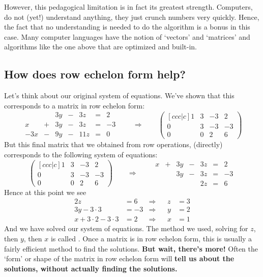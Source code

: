 \documentclass{ximera}
\begin{document}
However, this pedagogical limitation is in fact its greatest
strength. Computers, do not (yet!) understand anything, they just
crunch numbers very quickly. Hence, the fact that no understanding is
needed to do the algorithm is a bonus in this case. Many computer
languages have the notion of `vectors' and `matrices' and algorithms
like the one above that are optimized and built-in.




\subsection{How does row echelon form help?}

Let's think about our original system of equations. We've shown that
this corresponds to a matrix in row echelon form:
\[
\begin{array}{ccccccc}
       & & 3y &-& 3z &=& 2 \\
     x& +&3y&-&3z&=&-3\\
     -3x& -&9y&-&11z&=&0
\end{array}
\qquad\Longrightarrow\qquad
\begin{pmatrix}[ccc|c]
  1 &   3 & -3 & 2  \\
  0 &   3 & -3 & -3 \\
  0& 0  & 2 & 6
\end{pmatrix}
\]
But this final matrix that we obtained from row operations, (directly)
corresponds to the following system of equations:
\[
  \begin{pmatrix}[ccc|c]
    1 &   3 & -3 & 2  \\
    0 &   3 & -3 & -3 \\
    0& 0  & 2 & 6
  \end{pmatrix}
\qquad\Longrightarrow\qquad
\begin{array}{ccccccc}
     x  &+ & 3y &-& 3z &=& 2 \\
     &  &3y&-&3z&=&-3\\
     & & & &2z&=&6
\end{array}
\]
Hence at this point we see
\begin{align*}
  2z &= 6 &\Rightarrow  & & z &= 3\\
  3y-3\cdot 3 &= -3 &\Rightarrow  & & y &= 2\\
  x + 3\cdot 2 - 3\cdot 3 &= 2  &\Rightarrow & & x &= 1
\end{align*}
And we have solved our system of equations. The method we used,
solving for $z$, then $y$, then $x$ is called . Once a matrix is in row echelon form, this is usually
a fairly efficient method to find the solutions.  \textbf{But wait,
  there's more!}  Often the `form' or shape of the matrix in row
echelon form will \textbf{tell us about the solutions, without
  actually finding the solutions.}
\end{document}
